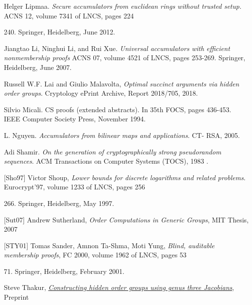 \documentclass[11pt, lettersize, notitlepage, leqno, footskip=0.6cm]{article}
\newcommand{\noin}{\noindent}
\numberwithin{equation}{section}
\begin{document}
\noin [Lip12] Helger Lipmaa. \textit{Secure accumulators from euclidean rings without trusted setup.} ACNS 12, volume 7341 of LNCS, pages 224{240. Springer, Heidelberg, June 2012.\vspace{0.1cm}

\noin [LLX07] Jiangtao Li, Ninghui Li, and Rui Xue.  \textit{Universal accumulators with efficient nonmembership proofs} ACNS 07, volume 4521 of LNCS, pages 253-269. Springer, Heidelberg, June 2007.\vspace{0.1cm}

\noin [LM18] Russell W.F. Lai and Giulio Malavolta,  \textit{Optimal succinct arguments via hidden order groups}. Cryptology ePrint Archive, Report 2018/705, 2018. \vspace{0.1cm}

\noin [Mic94] Silvio Micali. CS proofs (extended abstracts). In 35th FOCS, pages 436-453. IEEE Computer Society Press, November 1994.\vspace{0.1cm}

\noin [Ngu05] L. Nguyen. \textit{Accumulators from bilinear maps and applications}. CT-
RSA, 2005. \vspace{0.1cm}

\noin [Sha83] Adi Shamir. \textit{On the generation of cryptographically strong pseudorandom
sequences}. ACM Transactions on Computer Systems (TOCS), 1983 \vspace{0.1cm}.

\noin \hypertarget{Sho97}{[Sho97]} Victor Shoup, \textit{Lower bounds for discrete logarithms and related problems}. Eurocrypt'97, volume 1233 of LNCS, pages 256{266. Springer, Heidelberg, May 1997. \vspace{0.1cm}

\noin \hypertarget{Sut07}{[Sut07]} Andrew Sutherland, \textit{Order Computations in Generic Groups}, MIT Thesis, 2007 \vspace{0.1cm}

\noin \hypertarget{STY01}{[STY01]} Tomas Sander, Amnon Ta-Shma, Moti Yung, \textit{Blind, auditable membership proofs}, FC 2000, volume 1962 of LNCS, pages 53{71. Springer, Heidelberg, February 2001.\vspace{0.1cm}


\noin [Th20] Steve Thakur, \href{https://eprint.iacr.org/2020/348}{\textit{Constructing hidden order groups using genus three Jacobians}}, Preprint \vspace{0.1cm} 

}}}
\end{document}
